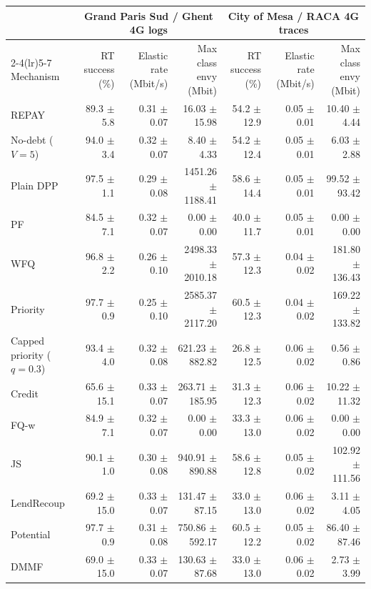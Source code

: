\begin{tabular}{lrrrrrr}
\toprule
 & \multicolumn{3}{c}{Grand Paris Sud / Ghent 4G logs} & \multicolumn{3}{c}{City of Mesa / RACA 4G traces} \\
\cmidrule(lr){2-4}\cmidrule(lr){5-7}
Mechanism & RT success (\%) & Elastic rate (Mbit/s) & Max class envy (Mbit) & RT success (\%) & Elastic rate (Mbit/s) & Max class envy (Mbit) \\
\midrule
REPAY & 89.3 $\pm$ 5.8 & 0.31 $\pm$ 0.07 & 16.03 $\pm$ 15.98 & 54.2 $\pm$ 12.9 & 0.05 $\pm$ 0.01 & 10.40 $\pm$ 4.44 \\
No-debt ($V=5$) & 94.0 $\pm$ 3.4 & 0.32 $\pm$ 0.07 & 8.40 $\pm$ 4.33 & 54.2 $\pm$ 12.4 & 0.05 $\pm$ 0.01 & 6.03 $\pm$ 2.88 \\
Plain DPP & 97.5 $\pm$ 1.1 & 0.29 $\pm$ 0.08 & 1451.26 $\pm$ 1188.41 & 58.6 $\pm$ 14.4 & 0.05 $\pm$ 0.01 & 99.52 $\pm$ 93.42 \\
PF & 84.5 $\pm$ 7.1 & 0.32 $\pm$ 0.07 & 0.00 $\pm$ 0.00 & 40.0 $\pm$ 11.7 & 0.05 $\pm$ 0.01 & 0.00 $\pm$ 0.00 \\
WFQ & 96.8 $\pm$ 2.2 & 0.26 $\pm$ 0.10 & 2498.33 $\pm$ 2010.18 & 57.3 $\pm$ 12.3 & 0.04 $\pm$ 0.02 & 181.80 $\pm$ 136.43 \\
Priority & 97.7 $\pm$ 0.9 & 0.25 $\pm$ 0.10 & 2585.37 $\pm$ 2117.20 & 60.5 $\pm$ 12.3 & 0.04 $\pm$ 0.02 & 169.22 $\pm$ 133.82 \\
Capped priority ($q=0.3$) & 93.4 $\pm$ 4.0 & 0.32 $\pm$ 0.08 & 621.23 $\pm$ 882.82 & 26.8 $\pm$ 12.5 & 0.06 $\pm$ 0.02 & 0.56 $\pm$ 0.86 \\
Credit & 65.6 $\pm$ 15.1 & 0.33 $\pm$ 0.07 & 263.71 $\pm$ 185.95 & 31.3 $\pm$ 12.3 & 0.06 $\pm$ 0.02 & 10.22 $\pm$ 11.32 \\
FQ-w & 84.9 $\pm$ 7.1 & 0.32 $\pm$ 0.07 & 0.00 $\pm$ 0.00 & 33.3 $\pm$ 13.0 & 0.06 $\pm$ 0.02 & 0.00 $\pm$ 0.00 \\
JS & 90.1 $\pm$ 1.0 & 0.30 $\pm$ 0.08 & 940.91 $\pm$ 890.88 & 58.6 $\pm$ 12.8 & 0.05 $\pm$ 0.02 & 102.92 $\pm$ 111.56 \\
LendRecoup & 69.2 $\pm$ 15.0 & 0.33 $\pm$ 0.07 & 131.47 $\pm$ 87.15 & 33.0 $\pm$ 13.0 & 0.06 $\pm$ 0.02 & 3.11 $\pm$ 4.05 \\
Potential & 97.7 $\pm$ 0.9 & 0.31 $\pm$ 0.08 & 750.86 $\pm$ 592.17 & 60.5 $\pm$ 12.2 & 0.05 $\pm$ 0.02 & 86.40 $\pm$ 87.46 \\
DMMF & 69.0 $\pm$ 15.0 & 0.33 $\pm$ 0.07 & 130.63 $\pm$ 87.68 & 33.0 $\pm$ 13.0 & 0.06 $\pm$ 0.02 & 2.73 $\pm$ 3.99 \\
\bottomrule
\end{tabular}
